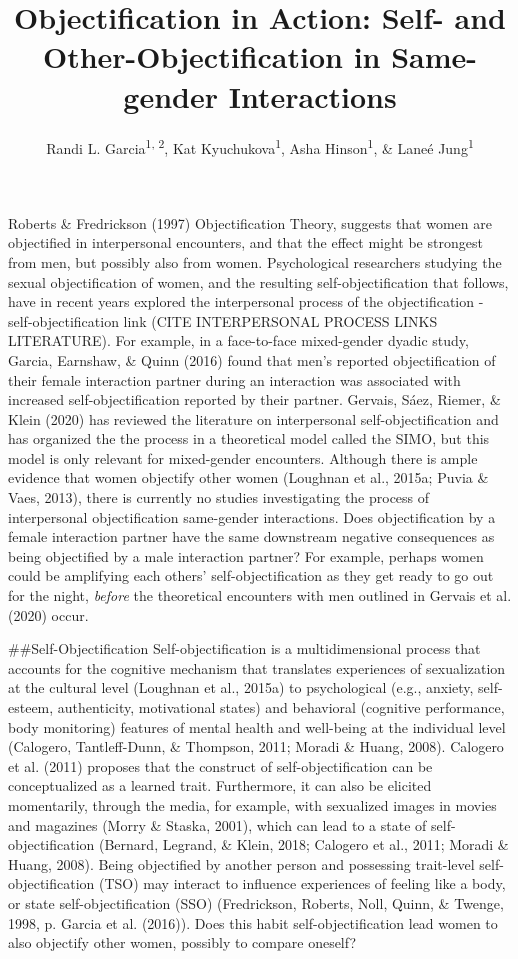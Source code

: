 \documentclass[
  man]{apa6}
\affiliation{
\vspace{0.5cm}
\textsuperscript{1} Department of Psychology, Smith College\\\textsuperscript{2} Program in Statistical and Data Sciences, Smith College}
\title{Objectification in Action: Self- and Other-Objectification in Same-gender Interactions}
\author{Randi L. Garcia\textsuperscript{1, 2}, Kat Kyuchukova\textsuperscript{1}, Asha Hinson\textsuperscript{1}, \& Laneé Jung\textsuperscript{1}}
\date{}
\begin{document}
\maketitle

Roberts \& Fredrickson (1997) Objectification Theory, suggests that women are objectified in interpersonal encounters, and that the effect might be strongest from men, but possibly also from women. Psychological researchers studying the sexual objectification of women, and the resulting self-objectification that follows, have in recent years explored the interpersonal process of the objectification - self-objectification link (CITE INTERPERSONAL PROCESS LINKS LITERATURE). For example, in a face-to-face mixed-gender dyadic study, Garcia, Earnshaw, \& Quinn (2016) found that men's reported objectification of their female interaction partner during an interaction was associated with increased self-objectification reported by their partner. Gervais, Sáez, Riemer, \& Klein (2020) has reviewed the literature on interpersonal self-objectification and has organized the the process in a theoretical model called the SIMO, but this model is only relevant for mixed-gender encounters. Although there is ample evidence that women objectify other women (Loughnan et al., 2015a; Puvia \& Vaes, 2013), there is currently no studies investigating the process of interpersonal objectification same-gender interactions. Does objectification by a female interaction partner have the same downstream negative consequences as being objectified by a male interaction partner? For example, perhaps women could be amplifying each others' self-objectification as they get ready to go out for the night, \emph{before} the theoretical encounters with men outlined in Gervais et al. (2020) occur.

\#\#Self-Objectification
Self-objectification is a multidimensional process that accounts for the cognitive mechanism that translates experiences of sexualization at the cultural level (Loughnan et al., 2015a) to psychological (e.g., anxiety, self-esteem, authenticity, motivational states) and behavioral (cognitive performance, body monitoring) features of mental health and well-being at the individual level (Calogero, Tantleff-Dunn, \& Thompson, 2011; Moradi \& Huang, 2008). Calogero et al. (2011) proposes that the construct of self-objectification can be conceptualized as a learned trait. Furthermore, it can also be elicited momentarily, through the media, for example, with sexualized images in movies and magazines (Morry \& Staska, 2001), which can lead to a state of self-objectification (Bernard, Legrand, \& Klein, 2018; Calogero et al., 2011; Moradi \& Huang, 2008). Being objectified by another person and possessing trait-level self-objectification (TSO) may interact to influence experiences of feeling like a body, or state self-objectification (SSO) (Fredrickson, Roberts, Noll, Quinn, \& Twenge, 1998, p. Garcia et al. (2016)). Does this habit self-objectification lead women to also objectify other women, possibly to compare oneself?
\end{document}
